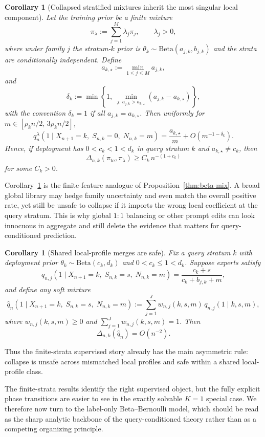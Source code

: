 \documentclass{article}
\newtheorem{corollary}[theorem]{Corollary}
\theoremstyle{definition}
\theoremstyle{remark}
\newcommand{\BetaDist}{\mathrm{Beta}}
\newcommand{\te}{\mathrm{te}}
\begin{document}
\begin{corollary}[Collapsed stratified mixtures inherit the most singular local component]
\label{cor:stratified-mix}
Let the training prior be a finite mixture
\[
\pi_\lambda
:=
\sum_{j=1}^M \lambda_j \pi_j,
\qquad
\lambda_j>0,
\]
where under family $j$ the stratum-$k$ prior is $\theta_k\sim \BetaDist(a_{j,k},b_{j,k})$ and the strata are conditionally independent. Define
\[
a_{k,\star}:=\min_{1\le j\le M} a_{j,k},
\]
and
\[
\delta_k
:=
\min\!\left\{
1,\;
\min_{j:\,a_{j,k}>a_{k,\star}}(a_{j,k}-a_{k,\star})
\right\},
\]
with the convention $\delta_k=1$ if all $a_{j,k}=a_{k,\star}$. Then uniformly for $m\in[\rho_k n/2,\,3\rho_k n/2]$,
\[
q_n^\lambda(1\mid X_{n+1}=k,\;S_{n,k}=0,\;N_{n,k}=m)
=
\frac{a_{k,\star}}{m}
+
O(m^{-1-\delta_k}).
\]
Hence, if deployment has $0<c_k<1<d_k$ in query stratum $k$ and $a_{k,\star}\neq c_k$, then
\[
\Delta_{n,k}(\pi_{\te},\pi_\lambda)\ge C_k\,n^{-(1+c_k)}
\]
for some $C_k>0$.
\end{corollary}

Corollary~\ref{cor:stratified-mix} is the finite-feature analogue of Proposition~\ref{thm:beta-mix}. A broad global library may hedge family uncertainty and even match the overall positive rate, yet still be unsafe to collapse if it imports the wrong local coefficient at the query stratum. This is why global $1{:}1$ balancing or other prompt edits can look innocuous in aggregate and still delete the evidence that matters for query-conditioned prediction.

\begin{corollary}[Shared local-profile merges are safe]
\label{cor:stratified-shared}
Fix a query stratum $k$ with deployment prior $\theta_k\sim \BetaDist(c_k,d_k)$ and $0<c_k\le 1<d_k$. Suppose experts satisfy
\[
q_{n,j}(1\mid X_{n+1}=k,\;S_{n,k}=s,\;N_{n,k}=m)
=
\frac{c_k+s}{c_k+b_{j,k}+m},
\]
and define any soft mixture
\[
\hat q_n(1\mid X_{n+1}=k,\;S_{n,k}=s,\;N_{n,k}=m)
:=
\sum_{j=1}^J w_{n,j}(k,s,m)\,
q_{n,j}(1\mid k,s,m),
\]
where $w_{n,j}(k,s,m)\ge 0$ and $\sum_{j=1}^J w_{n,j}(k,s,m)=1$. Then
\[
\Delta_{n,k}(\hat q_n)=O(n^{-2}).
\]
\end{corollary}

Thus the finite-strata supervised story already has the main asymmetric rule: collapse is unsafe across mismatched local profiles and safe within a shared local-profile class.

The finite-strata results identify the right supervised object, but the fully explicit phase transitions are easier to see in the exactly solvable $K=1$ special case. We therefore now turn to the label-only Beta--Bernoulli model, which should be read as the sharp analytic backbone of the query-conditioned theory rather than as a competing organizing principle.
\end{document}
